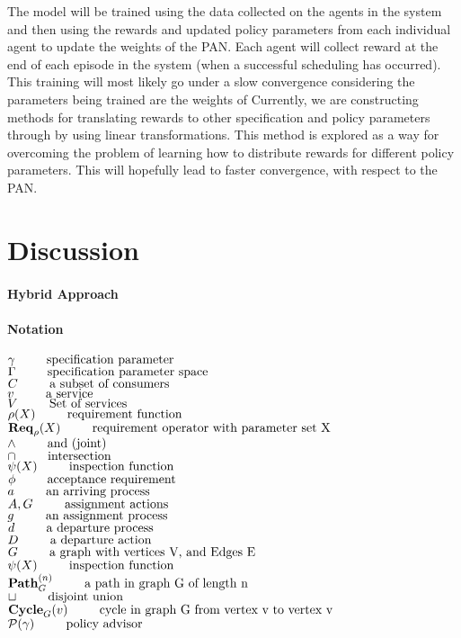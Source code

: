 \documentclass{article}
\newenvironment{notation}
{
    \newpage

    \paragraph{\Huge Notation}
    \begin{flushleft}
}
{
    \end{flushleft}
}
\newcommand{\notate}[2]{$#1 \hspace{0.35in} \mbox{#2}$}
\theoremstyle{definition}
\theoremstyle{remark}
\newcommand{\reqop}[2]{\mathbf{Req}_{#1}(#2)}
\newcommand{\path}[2]{\mathbf{Path}^{#2}_{#1}}
\newcommand{\cyclepath}[1]{\mathbf{Cycle}_{#1}}
\begin{document}
		The model will be trained using the data collected on the agents in the system and then using the rewards and updated policy parameters from each individual agent to update the weights of the PAN. Each agent will collect reward at the end of each episode in the system (when a successful scheduling has occurred). This training will most likely go under a slow convergence considering the parameters being trained are the weights of Currently, we are constructing methods for translating rewards to other specification and policy parameters through by using linear transformations. This method is explored as a way for overcoming the problem of learning how to distribute rewards for different policy parameters. This will hopefully lead to faster convergence, with respect to the PAN.

	\section{Discussion}

		\paragraph{Hybrid Approach}

	\newpage

	\begin{notation}
		\notate{\gamma}{specification parameter}\\
		\notate{\Gamma}{specification parameter space}\\
		\notate{C}{a subset of consumers}\\
		\notate{v}{a service}\\
		\notate{V}{Set of services}\\
		\notate{\rho(X)}{requirement function}\\
		\notate{\reqop{\rho}{X}}{requirement operator with parameter set X}\\
        \notate{\wedge}{and (joint)}\\
        \notate{\cap}{intersection}\\
        \notate{\psi(X)}{inspection function}\\
        \notate{\phi}{acceptance requirement}\\
		\notate{a}{an arriving process}\\
		\notate{A,G}{assignment actions}\\
		\notate{g}{an assignment process}\\
		\notate{d}{a departure process}\\
		\notate{D}{a departure action}\\
        \notate{G}{a graph with vertices V, and Edges E}\\
        \notate{\psi(X)}{inspection function}\\
        \notate{\path{G}{(n)}}{a path in graph G of length n}\\
        \notate{\sqcup}{disjoint union}\\
        \notate{\cyclepath{G}(v)}{cycle in graph G from vertex v to vertex v}\\
        \notate{\mathcal{P}(\gamma)}{policy advisor}
     \end{notation}

	\newpage
\end{document}
